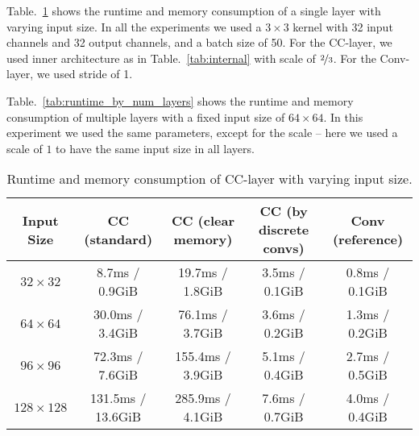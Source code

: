 \begin{appendices}
Table.~\ref{tab:runtime_by_sz} shows the runtime and memory consumption of a single layer with varying input size. In all the experiments we used a $3\times3$ kernel with 32 input channels and 32 output channels, and a batch size of 50. For the CC-layer, we used inner architecture as in Table.~\ref{tab:internal} with scale of $\nicefrac{2}{3}$. For the Conv-layer, we used stride of 1.

Table.~\ref{tab:runtime_by_num_layers} shows the runtime and memory consumption of multiple layers with a fixed input size of $64\times64$. In this experiment we used the same parameters, except for the scale -- here we used a scale of $1$ to have the same input size in all layers.

\begin{table}[h!]
    \centering
    \begin{tabular}{c|cccc}
    \toprule

Input Size     & CC (standard)     & CC (clear memory) & CC (by discrete convs) & Conv (reference) \\
\midrule
$32\times32$   & 8.7ms / 0.9GiB    & 19.7ms / 1.8GiB   & 3.5ms / 0.1GiB         & 0.8ms / 0.1GiB   \\
$64\times64$   & 30.0ms / 3.4GiB   & 76.1ms / 3.7GiB   & 3.6ms / 0.2GiB         & 1.3ms / 0.2GiB   \\
$96\times96$   & 72.3ms / 7.6GiB   & 155.4ms / 3.9GiB  & 5.1ms / 0.4GiB         & 2.7ms / 0.5GiB   \\
$128\times128$ & 131.5ms / 13.6GiB & 285.9ms / 4.1GiB  & 7.6ms / 0.7GiB         & 4.0ms / 0.4GiB   \\
    \bottomrule

    \end{tabular}
    \vspace{5pt}
    \caption{Runtime and memory consumption of CC-layer with varying input size.}
    \label{tab:runtime_by_sz}
\end{table}


\end{appendices}
